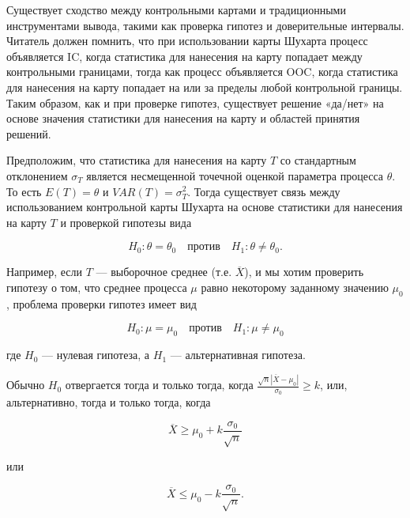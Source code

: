 Существует сходство между контрольными картами и традиционными инструментами вывода, такими как проверка гипотез и доверительные интервалы. Читатель должен помнить, что при использовании карты Шухарта процесс объявляется IC, когда статистика для нанесения на карту попадает между контрольными границами, тогда как процесс объявляется OOC, когда статистика для нанесения на карту попадает на или за пределы любой контрольной границы. Таким образом, как и при проверке гипотез, существует решение «да/нет» на основе значения статистики для нанесения на карту и областей принятия решений.

Предположим, что статистика для нанесения на карту \(T\) со стандартным отклонением \(\sigma_T\) является несмещенной точечной оценкой параметра процесса \(\theta\). То есть \(E(T) = \theta\) и \(VAR(T) = \sigma_T^2\). Тогда существует связь между использованием контрольной карты Шухарта на основе статистики для нанесения на карту \(T\) и проверкой гипотезы вида

\[
H_0: \theta = \theta_0 \quad \text{против} \quad H_1: \theta \neq \theta_0.
\]

Например, если \(T\) — выборочное среднее (т.е. \(\overline{X}\)), и мы хотим проверить гипотезу о том, что среднее процесса \(\mu\) равно некоторому заданному значению \(\mu_0\), проблема проверки гипотез имеет вид

\[
H_0: \mu = \mu_0 \quad \text{против} \quad H_1: \mu \neq \mu_0
\]

где \(H_0\) — нулевая гипотеза, а \(H_1\) — альтернативная гипотеза.

Обычно \(H_0\) отвергается тогда и только тогда, когда \(\frac{\sqrt{n}|\overline{X} - \mu_0|}{\sigma_0} \geq k\), или, альтернативно, тогда и только тогда, когда

\begin{equation}
	\overline{X} \geq \mu_0 + k\frac{\sigma_0}{\sqrt{n}}
	\label{eq:2.2}
\end{equation}

или

\begin{equation}
	\overline{X} \leq \mu_0 - k\frac{\sigma_0}{\sqrt{n}}.
	\label{eq:2.3}
\end{equation}

